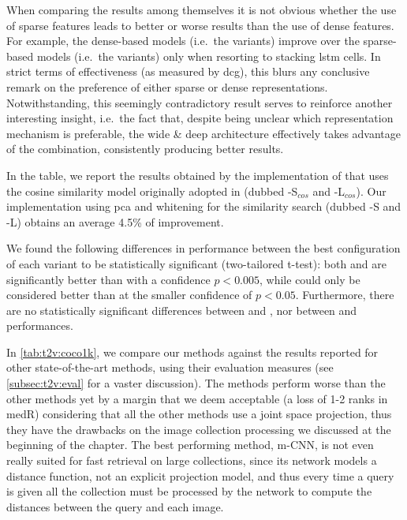 When comparing the \ttv{} results among themselves it is not obvious whether the use of sparse features leads to better or worse results than the use of dense features.
For example, the dense-based models (i.e.\ the \densettv{} variants) improve over the sparse-based models (i.e.\ the \sparsettv{} variants) only when resorting to stacking \gls{lstm} cells.
In strict terms of effectiveness (as measured by \gls{dcg}), this blurs any conclusive remark on the preference of either sparse or dense representations.
Notwithstanding, this seemingly contradictory result serves to reinforce another interesting insight, i.e.\ the fact that, despite being unclear which representation mechanism is preferable, the wide \& deep architecture effectively takes advantage of the combination, consistently producing better results.


In the table, we report the results obtained by the implementation of \wordvisual{} that uses the cosine similarity model originally adopted in \cite{dong2018predicting} (dubbed \wordvisual{}-S$_{cos}$ and \wordvisual{}-L$_{cos}$).
Our implementation using \gls{pca} and whitening for the similarity search (dubbed \wordvisual{}-S and \wordvisual{}-L) obtains an average 4.5\% of improvement.

We found the following differences in performance between the best configuration of each variant to be statistically significant (two-tailored t-test): both \densettv{} and \widedeepttv{} are significantly better than \sparsettv{} with a confidence $p<0.005$, while \widedeepttv{} could only be considered better than \wordvisual{} at the smaller confidence of $p<0.05$.
Furthermore, there are no statistically significant differences between \widedeepttv{} and \densettv{}, nor between \densettv{} and \wordvisual{} performances.

In \ref{tab:t2v:coco1k}, we compare our methods against the results reported for other state-of-the-art methods, using their evaluation measures (see \ref{subsec:t2v:eval} for a vaster discussion).
The \ttv{} methods perform worse than the other methods yet by a margin that we deem acceptable (a loss of 1-2 ranks in \gls{medR}) considering that all the other methods use a joint space projection, thus they have the drawbacks on the image collection processing we discussed at the beginning of the chapter. %
The best performing method, m-CNN, is not even really suited for fast retrieval on large collections, since its network models a distance function, not an explicit projection model, and thus every time a query is given all the collection must be processed by the network to compute the distances between the query and each image.


